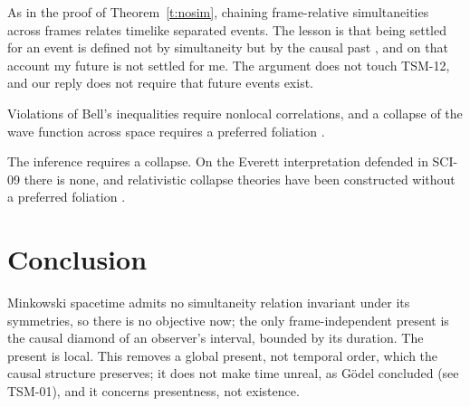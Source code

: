 \documentclass{situationist-preprint}
\begin{document}
\begin{reply}
As in the proof of Theorem~\ref{t:nosim}, chaining frame-relative simultaneities across frames relates timelike separated events. The lesson is that being settled for an event is defined not by simultaneity but by the causal past \citep{Stein1968,Stein1991}, and on that account my future is not settled for me. The argument does not touch TSM-12, and our reply does not require that future events exist.
\end{reply}

\begin{objection}\label{o:quantum}
Violations of Bell's inequalities require nonlocal correlations, and a collapse of the wave function across space requires a preferred foliation \citep{Maudlin1994}.
\end{objection}

\begin{reply}
The inference requires a collapse. On the Everett interpretation defended in SCI-09 there is none, and relativistic collapse theories have been constructed without a preferred foliation \citep{Tumulka2006}.
\end{reply}

\section{Conclusion}

Minkowski spacetime admits no simultaneity relation invariant under its symmetries, so there is no objective now; the only frame-independent present is the causal diamond of an observer's interval, bounded by its duration. The present is local. This removes a global present, not temporal order, which the causal structure preserves; it does not make time unreal, as G\"odel concluded (see TSM-01), and it concerns presentness, not existence.
\end{document}
